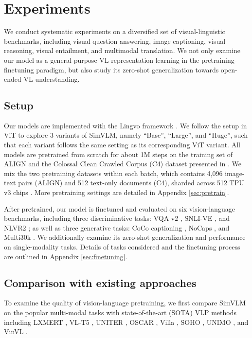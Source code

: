 \documentclass{article} \usepackage{iclr2022_conference,times}
\newcommand{\ours}{SimVLM}
\begin{document}
\section{Experiments}

We conduct systematic experiments on a diversified set of visual-linguistic benchmarks,
including visual question answering, 
image captioning, 
visual reasoning,
visual entailment,
and multimodal translation.
We not only examine our model as a general-purpose VL representation learning in the pretraining-finetuning paradigm,
but also study its zero-shot generalization towards open-ended VL understanding.

\subsection{Setup}

Our models are implemented with the Lingvo framework \citep{shen2019lingvo}. 
We follow the setup in ViT \citep{dosovitskiy2021an} to explore 3 variants of \ours,
namely ``Base'', ``Large'', and ``Huge'',
such that each variant follows the same setting as its corresponding ViT variant.
All models are pretrained from scratch for about 1M steps on the training set of ALIGN \citep{jia2021scaling} and the Colossal Clean Crawled Corpus (C4) dataset presented in \citet{raffel2019exploring}.
We mix the two pretraining datasets within each batch, which contains 4,096 image-text pairs (ALIGN) and 512 text-only documents (C4), sharded across 512 TPU v3 chips \citep{jouppi2017indatacenter}.
More pretraining settings are detailed in Appendix \ref{sec:pretrain}.

After pretrained, our model is finetuned and evaluated on six vision-language benchmarks,
including three discriminative tasks: VQA v2 \citep{goyal2017making}, SNLI-VE \citep{xie2019visual}, and NLVR2 \citep{suhr2018corpus}; as well as three generative tasks: CoCo captioning \citep{chen2015microsoft}, NoCaps \citep{agrawal2019nocaps}, and Multi30k \citep{elliott2016multi30k}.
We additionally examine its zero-shot generalization and performance on single-modality tasks.
Details of tasks considered and the finetuning process are outlined in Appendix \ref{sec:finetuning}.

\subsection{Comparison with existing approaches}
To examine the quality of vision-language pretraining, we first compare {\ours} on the popular multi-modal tasks with state-of-the-art (SOTA) VLP methods including
LXMERT \citep{tan-bansal-2019-lxmert}, VL-T5 \citep{cho2021unifying},
UNITER \citep{chen2020uniter}, OSCAR \citep{li2020oscar}, Villa \citep{gan2020large}, SOHO \citep{huang2021seeing}, UNIMO \citep{li-etal-2021-unimo}, and VinVL \citep{Zhang_2021_CVPR}.
\end{document}
